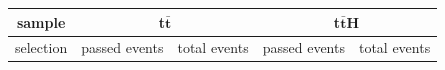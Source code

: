 \begin{table}
		\centering
                \footnotesize
                \renewcommand{\arraystretch}{1.2}
		\begin{tabular*}{\linewidth}{@{\extracolsep{\fill}}ccccc}
		\hline
		\hline
		 \textbf{sample}  & \multicolumn{2}{c}{\textbf{t$\bar{\textbf{t}}$}}  & \multicolumn{2}{c}{\textbf{t$\bar{\textbf{t}}$H}} 
		\\
		\hline
		selection  & passed events      & total events & passed events      & total events
		\\ 
		\hline

\end{tabular*}
\end{table}

